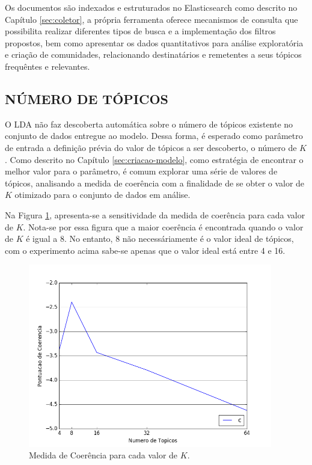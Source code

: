 \documentclass[12pt,a4paper]{article}
\begin{document}
Os documentos são indexados e estruturados no Elasticsearch como descrito no Capítulo \ref{sec:coletor}, a própria ferramenta oferece mecanismos de consulta que possibilita realizar diferentes tipos de busca e a implementação dos filtros propostos, bem como apresentar os dados quantitativos para análise exploratória e criação de comunidades, relacionando destinatários e remetentes a seus tópicos frequêntes e relevantes.

\subsection{NÚMERO DE TÓPICOS} \label{sec:n-topicos}

O LDA não faz descoberta automática  sobre o número de tópicos existente no conjunto de dados entregue ao modelo. Dessa forma,
 é esperado como parâmetro de entrada a definição prévia do valor de tópicos a ser descoberto, o número de $K$. Como descrito no Capítulo \ref{sec:criacao-modelo}, como estratégia de encontrar o melhor valor para o parâmetro, é comum explorar uma série de valores de tópicos, analisando  a medida de coerência com a finalidade de se obter o valor de $K$ otimizado para o conjunto de dados em análise.

Na Figura \ref{fig-cm-4-to-64}, apresenta-se a sensitividade da medida de coerência para cada valor de $K$. Nota-se por essa figura que a maior coerência é encontrada quando o valor de $K$ é igual a 8. No entanto, 8 não necessáriamente é o valor ideal de tópicos, com o experimento acima sabe-se apenas que o valor ideal está entre 4 e 16.

\begin{figure}[H]
	\centering
    \includegraphics[height=8cm]{images/figure_5.png}
    \caption{Medida de Coerência para cada valor de $K$.}
    \label{fig-cm-4-to-64}
\end{figure}
\end{document}
